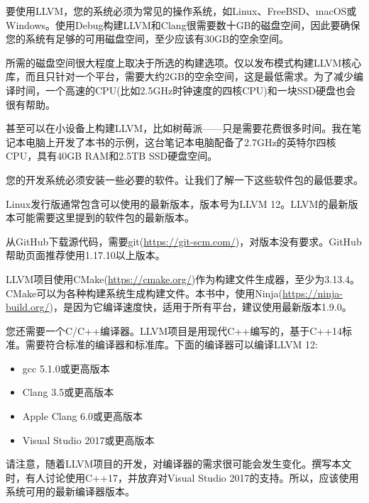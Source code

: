 要使用LLVM，您的系统必须为常见的操作系统，如Linux、FreeBSD、macOS或Windows。使用Debug构建LLVM和Clang很需要数十GB的磁盘空间，因此要确保您的系统有足够的可用磁盘空间，至少应该有30GB的空余空间。\par

所需的磁盘空间很大程度上取决于所选的构建选项。仅以发布模式构建LLVM核心库，而且只针对一个平台，需要大约2GB的空余空间，这是最低需求。为了减少编译时间，一个高速的CPU(比如2.5GHz时钟速度的四核CPU)和一块SSD硬盘也会很有帮助。\par

甚至可以在小设备上构建LLVM，比如树莓派——只是需要花费很多时间。我在笔记本电脑上开发了本书的示例，这台笔记本电脑配备了2.7GHz的英特尔四核CPU，具有40GB RAM和2.5TB SSD硬盘空间。\par

您的开发系统必须安装一些必要的软件。让我们了解一下这些软件包的最低要求。\par

\begin{tcolorbox}[colback=blue!5!white,colframe=blue!75!black, title=Note]
Linux发行版通常包含可以使用的最新版本，版本号为LLVM 12。LLVM的最新版本可能需要这里提到的软件包的最新版本。
\end{tcolorbox}

从GitHub下载源代码，需要git(\url{https://git-scm.com/})，对版本没有要求。GitHub帮助页面推荐使用1.17.10以上版本。\par

LLVM项目使用CMake(\url{https://cmake.org/})作为构建文件生成器，至少为3.13.4。CMake可以为各种构建系统生成构建文件。本书中，使用Ninja(\url{https://ninja-build.org/})，是因为它编译速度快，适用于所有平台，建议使用最新版本1.9.0。\par

您还需要一个C/C++编译器。LLVM项目是用现代C++编写的，基于C++14标准。需要符合标准的编译器和标准库。下面的编译器可以编译LLVM 12:\par

\begin{itemize}
	\item gcc 5.1.0或更高版本
	\item Clang 3.5或更高版本
	\item Apple Clang 6.0或更高版本
	\item Visual Studio 2017或更高版本
\end{itemize}

请注意，随着LLVM项目的开发，对编译器的需求很可能会发生变化。撰写本文时，有人讨论使用C++17，并放弃对Visual Studio 2017的支持。所以，应该使用系统可用的最新编译器版本。\par

